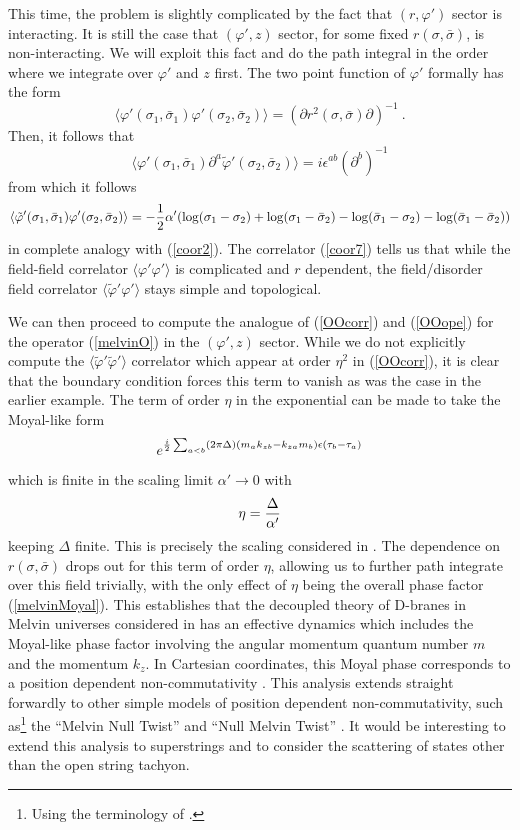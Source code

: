 \documentclass[12pt]{article}
\newcommand{\be}{\begin{equation}}
\newcommand{\ee}{\end{equation}}
\begin{document}
This time, the problem is slightly complicated by the fact that
$(r,\varphi')$ sector is interacting. It is still the case that $(\varphi',z)$
sector, for some fixed $r(\sigma,\bar \sigma)$, is non-interacting. We
will exploit this fact and do the path integral in the order where we
integrate over $\varphi'$ and $z$ first.
%
The two point function of $\varphi'$ formally has the form
%
\be \langle \varphi'(\sigma_1, \bar \sigma_1)\varphi'(\sigma_2, \bar \sigma_2) \rangle = (\partial r^2(\sigma,\bar \sigma) \partial)^{-1} \ .  \ee
%
Then, it follows that
%
\be \langle \varphi'(\sigma_1, \bar \sigma_1)\partial^a \tilde \varphi'(\sigma_2, \bar \sigma_2) \rangle = i \epsilon^{ab} (\partial^b)^{-1}  
\ee
%
from which it follows 
%
\be \langle \tilde \varphi'(\sigma_1,\bar \sigma_1) \varphi'(\sigma_2,\bar \sigma_2) \rangle
= - {1 \over 2} \alpha'  (
\log(\sigma_1- \sigma_2) +
\log(\sigma_1- \bar \sigma_2) -
\log(\bar \sigma_1- \sigma_2) -
\log(\bar \sigma_1- \bar \sigma_2) ) \label{coor7} \ee
%
in complete analogy with (\ref{coor2}). The correlator (\ref{coor7})
tells us that while the field-field correlator $\langle \varphi' \varphi'
\rangle$ is complicated and $r$ dependent, the field/disorder field
correlator $\langle \tilde \varphi' \varphi' \rangle$ stays simple and
topological.

We can then proceed to compute the analogue of (\ref{OOcorr}) and
(\ref{OOope}) for the operator (\ref{melvinO}) in the $(\varphi',z)$
sector.  While we do not explicitly compute the $\langle \tilde \varphi'
\tilde \varphi' \rangle$ correlator which appear at order $\eta^2$ in
(\ref{OOcorr}), it is clear that the boundary condition forces this
term to vanish as was the case in the earlier example.  The term of
order $\eta$ in the exponential can be made to take the Moyal-like
form
%
\be e^{{i \over 2}  \sum_{a < b} (2 \pi \Delta) (m_a k_{zb} - k_{za} m_b) \epsilon(\tau_b-\tau_a)}  \label{melvinMoyal}\ee
%
which is finite in the scaling limit $\alpha' \rightarrow 0$ with
%
\be \eta = {\Delta \over \alpha'} \ee
%
keeping $\Delta$ finite. This is precisely the scaling considered in
\cite{Hashimoto:2004pb,Hashimoto:2005hy}. The dependence on $r(\sigma,
\bar \sigma)$ drops out for this term of order $\eta$, allowing us to
further path integrate over this field trivially, with the only effect
of $\eta$ being the overall phase factor (\ref{melvinMoyal}).  This
establishes that the decoupled theory of D-branes in Melvin universes
considered in \cite{Hashimoto:2004pb,Hashimoto:2005hy} has an
effective dynamics which includes the Moyal-like phase factor
involving the angular momentum quantum number $m$ and the momentum
$k_z$. In Cartesian coordinates, this Moyal phase corresponds to a
position dependent non-commutativity
\cite{Hashimoto:2004pb,Hashimoto:2005hy}. This analysis extends
straight forwardly to other simple models of position dependent
non-commutativity, such as\footnote{Using the terminology of
\cite{Hashimoto:2004pb}.} the ``Melvin Null Twist''
\cite{Hashimoto:2002nr} and ``Null Melvin Twist''
\cite{Dolan:2002px}. It would be interesting to extend this analysis
to superstrings and to consider the scattering of states other than
the open string tachyon.
\end{document}
